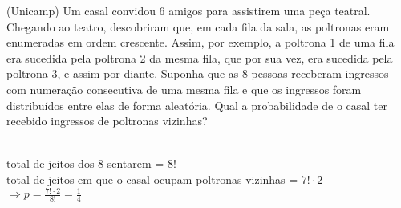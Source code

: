 \begin{ex}
(Unicamp) Um casal convidou 6 amigos para assistirem uma peça teatral. Chegando ao teatro, descobriram que, em cada fila da sala, as poltronas eram enumeradas em ordem crescente. Assim, por exemplo, a poltrona 1 de uma fila era sucedida pela poltrona 2 da mesma fila, que por sua vez, era sucedida pela poltrona 3, e assim por diante. Suponha que as 8 pessoas receberam ingressos com numeração consecutiva de uma mesma fila e que os ingressos foram distribuídos entre elas de forma aleatória. Qual a probabilidade de o casal ter recebido ingressos de poltronas vizinhas?
  \begin{sol}
    \phantom{A} \\
    total de jeitos dos 8 sentarem = 8! \\
    total de jeitos em que o casal ocupam poltronas vizinhas = $7!\cdot2$  \\
    $\Longrightarrow p =\frac{7!\cdot2}{8!}=\frac{1}{4}$
    
    
  \end{sol}
\end{ex}